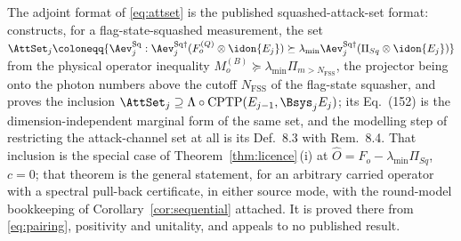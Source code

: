 
\begin{remark}
\label{rem:publishedlicence}
The adjoint format of \eqref{eq:attset} is the published squashed-attack-set
format: \cite[Lemma~9.4, Eq.~(151)]{tupkary2026decoy} constructs, for a
flag-state-squashed measurement, the set
$\AttSet_j\coloneqq\{\Aev^{\mathrm{Sq}}_j:
\Aev^{\mathrm{Sq}\dagger}_j(F^{(Q)}_o\otimes\idon{E_j})\succeq
\lambda_{\min}\Aev^{\mathrm{Sq}\dagger}_j(\Pi_{Sq}\otimes\idon{E_j})\}$ from
the physical operator inequality
$M^{(B)}_o\succeq\lambda_{\min}\Pi_{m>N_{\mathrm{FSS}}}$, the projector being
onto the photon numbers above the cutoff $N_{\mathrm{FSS}}$ of the flag-state
squasher, and
proves the inclusion $\AttSet_j\supseteq\Lambda\circ
\mathrm{CPTP}(E_{j-1},\Bsys_jE_j)$; its Eq.~(152) is the dimension-independent
marginal form of the same set, and the modelling step of restricting the
attack-channel set at all is its Def.~8.3 with Rem.~8.4. That inclusion is the
special case of Theorem~\ref{thm:licence}\,(i) at
$\hat O=F_o-\lambda_{\min}\Pi_{Sq}$, $c=0$; that theorem is the general
statement, for an arbitrary carried operator with a spectral pull-back
certificate, in either source mode, with the round-model bookkeeping of
Corollary~\ref{cor:sequential} attached. It is proved there from
\eqref{eq:pairing}, positivity and unitality, and appeals to no published
result.
\end{remark}
